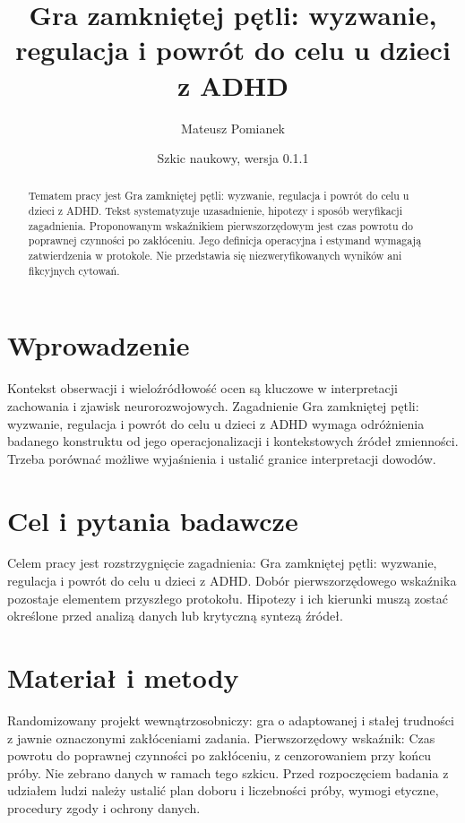 \documentclass[11pt,a4paper]{article}
\title{Gra zamkniętej pętli: wyzwanie, regulacja i powrót do celu u dzieci z ADHD}
\author{Mateusz Pomianek}
\date{Szkic naukowy, wersja 0.1.1}
\begin{document}
\maketitle

\begin{abstract}

Tematem pracy jest Gra zamkniętej pętli: wyzwanie, regulacja i powrót do celu u dzieci z ADHD. Tekst systematyzuje uzasadnienie, hipotezy i sposób weryfikacji zagadnienia. Proponowanym wskaźnikiem pierwszorzędowym jest czas powrotu do poprawnej czynności po zakłóceniu. Jego definicja operacyjna i estymand wymagają zatwierdzenia w protokole. Nie przedstawia się niezweryfikowanych wyników ani fikcyjnych cytowań.

\end{abstract}

\section{Wprowadzenie}

Kontekst obserwacji i wieloźródłowość ocen są kluczowe w interpretacji zachowania i zjawisk neurorozwojowych. Zagadnienie Gra zamkniętej pętli: wyzwanie, regulacja i powrót do celu u dzieci z ADHD wymaga odróżnienia badanego konstruktu od jego operacjonalizacji i kontekstowych źródeł zmienności. Trzeba porównać możliwe wyjaśnienia i ustalić granice interpretacji dowodów.

\section{Cel i pytania badawcze}

Celem pracy jest rozstrzygnięcie zagadnienia: Gra zamkniętej pętli: wyzwanie, regulacja i powrót do celu u dzieci z ADHD. Dobór pierwszorzędowego wskaźnika pozostaje elementem przyszłego protokołu. Hipotezy i ich kierunki muszą zostać określone przed analizą danych lub krytyczną syntezą źródeł.

\section{Materiał i metody}

Randomizowany projekt wewnątrzosobniczy: gra o adaptowanej i stałej trudności z jawnie oznaczonymi zakłóceniami zadania. Pierwszorzędowy wskaźnik: Czas powrotu do poprawnej czynności po zakłóceniu, z cenzorowaniem przy końcu próby. Nie zebrano danych w ramach tego szkicu. Przed rozpoczęciem badania z udziałem ludzi należy ustalić plan doboru i liczebności próby, wymogi etyczne, procedury zgody i ochrony danych.
\end{document}
